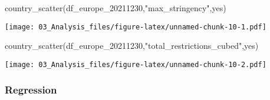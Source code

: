 \documentclass[
]{article}
\newenvironment{Shaded}{\begin{snugshade}}{\end{snugshade}}
\newcommand{\FunctionTok}[1]{\textcolor[rgb]{0.00,0.00,0.00}{#1}}
\newcommand{\NormalTok}[1]{#1}
\newcommand{\StringTok}[1]{\textcolor[rgb]{0.31,0.60,0.02}{#1}}
\begin{document}
\begin{Shaded}
\begin{Highlighting}[]
\FunctionTok{country\_scatter}\NormalTok{(df\_europe\_20211230,}\StringTok{"max\_stringency"}\NormalTok{,}\StringTok{\textquotesingle{}yes\textquotesingle{}}\NormalTok{)}
\end{Highlighting}
\end{Shaded}

\texttt{[image: 03\_Analysis\_files/figure-latex/unnamed-chunk-10-1.pdf]}

\begin{Shaded}
\begin{Highlighting}[]
\FunctionTok{country\_scatter}\NormalTok{(df\_europe\_20211230,}\StringTok{"total\_restrictions\_cubed"}\NormalTok{,}\StringTok{\textquotesingle{}yes\textquotesingle{}}\NormalTok{)}
\end{Highlighting}
\end{Shaded}

\texttt{[image: 03\_Analysis\_files/figure-latex/unnamed-chunk-10-2.pdf]}

\hypertarget{regression-1}{%
\subsubsection{Regression}\label{regression-1}}
\end{document}
